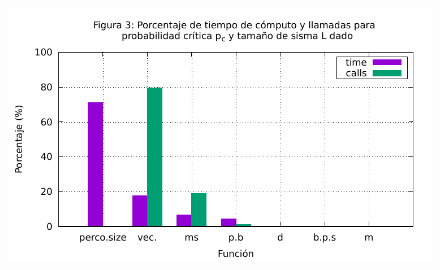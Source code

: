 \documentclass{article}
\begin{document}
\begin{figure}[h!]
\begin{center}
\includegraphics[scale=1]{profile1.pdf}
\label{fig2}
\end{center}
\end{figure}
\end{document}
